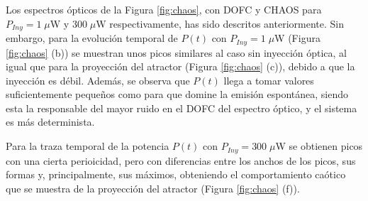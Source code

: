 	Los espectros \'opticos de la Figura \ref{fig:chaos}, con DOFC y CHAOS para $P_{Iny} = 1\;\mu$W y $300\;\mu$W respectivamente, has sido descritos anteriormente. Sin embargo, para la evoluci\'on temporal de $P(t)$ con $P_{Iny} = 1\;\mu$W (Figura \ref{fig:chaos} (b)) se muestran unos picos similares al caso sin inyecci\'on \'optica, al igual que para la proyecci\'on del atractor (Figura \ref{fig:chaos} (c)), debido a que la inyecci\'on es d\'ebil. Adem\'as, se observa que $P(t)$ llega a tomar valores suficientemente pequeños como para que domine la emisión espont\'anea, siendo esta la responsable del mayor ruido en el DOFC del espectro \'optico, y el sistema es m\'as determinista.

	Para la traza temporal de la potencia $P(t)$ con $P_{Iny} = 300\;\mu$W se obtienen picos con una cierta perioicidad, pero con diferencias entre los anchos de los picos, sus formas y, principalmente, sus m\'aximos, obteniendo el comportamiento ca\'otico que se muestra de la proyecci\'on del atractor (Figura \ref{fig:chaos} (f)).
